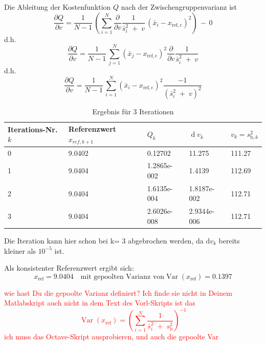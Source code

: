 Die Ableitung der Kostenfunktion $Q$ nach der Zwischengruppenvarianz ist
\begin{equation*}
\frac{\partial Q}{\partial v} = \frac{1}{N-1} \, \left( \sum\limits_{i=1}^N 
\frac{\partial }{\partial v} \frac{1}{\bar s^2_i \; + \; v} \, \left(\bar x_i - x_\mathrm{ref, c}\right)^2  \right) \, - \, 0
\end{equation*}
d.h.
\begin{equation*}
\frac{\partial Q}{\partial v} = \frac{1}{N-1} \, \sum\limits_{j=1}^N  \left(\bar x_j - x_\mathrm{ref, c}\right)^2 
\frac{\partial }{\partial v} \frac{1}{\bar s^2_i \; + \; v} 
\end{equation*}
d.h.
\begin{equation}
\frac{\partial Q}{\partial v} = \frac{1}{N-1} \, \sum\limits_{i=1}^N  \left(\bar x_i - x_\mathrm{ref, c}\right)^2 
\frac{-1}{\left(\bar s^2_i \; + \; v\right)^2} 
\end{equation}

\begin{table}[!htb]
	\caption{Ergebnis für 3 Iterationen}
	\begin{center}
		\begin{tabular}{p{2cm}| p{3.5cm} | p{3cm} |p{3cm}|p{2cm}}
			\hline 
			Iterations-Nr. $k$ & Referenzwert $x_{ref,k+1}$ & $Q_{k}$ & $\operatorname{d} v_k$ & $v_k = s^2_{\mathrm{b},k}$\\ \hline
			0 & 9.0402 & 0.12702 & 11.275 &  111.27\\ \hline
			1 & 9.0404 & 1.2865e-002 & 1.4139 & 112.69\\ \hline
			2 & 9.0404 & 1.6135e-004 & 1.8187e-002 & 112.71 \\ \hline
			3 & 9.0404 & 2.6026e-008 & 2.9344e-006 & 112.71 \\ \hline
		\end{tabular}
	\end{center}
	\label{tab:Iteration_von_Beispiel II}
\end{table}

Die Iteration kann hier schon bei k= 3 abgebrochen werden, da $\mathrm{d} v_k$ bereits 
kleiner als $10^{-5}$ ist. 

Als konsistenter Referenzwert ergibt sich:
\begin{equation}
x_\mathrm{ref} = 9.0404 \quad \text{mit gepoolten Varianz von} 
\operatorname{Var}(x_\mathrm{ref}) = 0.1397
\end{equation}

\textcolor{red}{wie hast Du die gepoolte Varianz definiert? Ich finde sie nicht in Deinem Matlabskript auch nicht in
dem Text des Vorl-Skripts ist das
$$
\operatorname{Var}(x_\mathrm{ref}) = \left(\sum\limits_{i=1}^N \frac{1}{\bar s^2_i \; + \; s^2_\mathrm{b}}\right)^{-1}
$$
ich muss das Octave-Skript ausprobieren, und auch die gepoolte Var}

